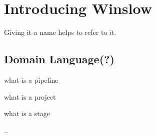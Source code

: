 \chapter{Introducing Winslow}

Giving it a name helps to refer to it.

\section{Domain Language(?)}

what is a pipeline

what is a project

what is a stage

..